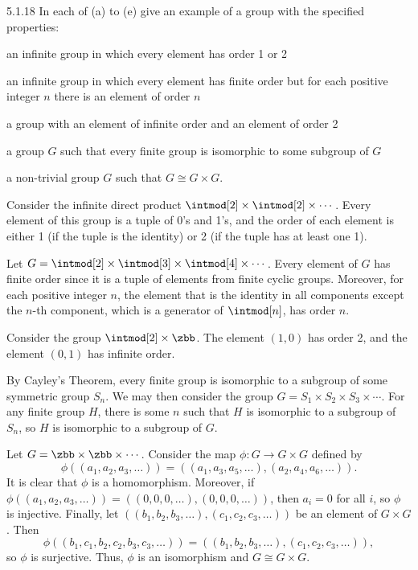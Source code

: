 \begin{exercise}{5.1.18}
    In each of (a) to (e) give an example of a group with the specified properties:
    \begin{subexercises}
        \item an infinite group in which every element has order 1 or 2
        \item an infinite group in which every element has finite order but for each positive integer $n$ there is an element of order $n$
        \item a group with an element of infinite order and an element of order 2
        \item a group $G$ such that every finite group is isomorphic to some subgroup of $G$
        \item a non-trivial group $G$ such that $G \cong G \times G$.
    \end{subexercises}
\end{exercise}

\begin{solenum}
    \item Consider the infinite direct product $\intmod[2] \times \intmod[2] \times \cdots$.
	Every element of this group is a tuple of 0's and 1's, and the order of each element is either 1 (if the tuple is the identity) or 2 (if the tuple has at least one 1).
    \item Let $G = \intmod[2] \times \intmod[3] \times \intmod[4] \times \cdots$.
	Every element of $G$ has finite order since it is a tuple of elements from finite cyclic groups.
	Moreover, for each positive integer $n$, the element that is the identity in all components except the $n$-th component, which is a generator of $\intmod[n]$, has order $n$.
    \item Consider the group $\intmod[2] \times \zbb$.
	The element $(1, 0)$ has order 2, and the element $(0, 1)$ has infinite order.
    \item By Cayley's Theorem, every finite group is isomorphic to a subgroup of some symmetric group $S_n$.
	We may then consider the group $G = S_1 \times S_2 \times S_3 \times \cdots$.
	For any finite group $H$, there is some $n$ such that $H$ is isomorphic to a subgroup of $S_n$, so $H$ is isomorphic to a subgroup of $G$.
    \item Let $G = \zbb \times \zbb \times \cdots$.
	Consider the map $\phi : G \to G \times G$ defined by
    \[
    	\phi((a_1, a_2, a_3, \ldots)) = ((a_1, a_3, a_5, \ldots), (a_2, a_4, a_6, \ldots)).
    \]
    It is clear that $\phi$ is a homomorphism.
	Moreover, if $\phi((a_1, a_2, a_3, \ldots)) = ((0, 0, 0, \ldots), (0, 0, 0, \ldots))$, then $a_i = 0$ for all $i$, so $\phi$ is injective.
	Finally, let $((b_1, b_2, b_3, \ldots), (c_1, c_2, c_3, \ldots))$ be an element of $G \times G$.
	Then 
    \[
    	\phi((b_1, c_1, b_2, c_2, b_3, c_3, \ldots)) = ((b_1, b_2, b_3, \ldots), (c_1, c_2, c_3, \ldots)),
    \]
    so $\phi$ is surjective.
	Thus, $\phi$ is an isomorphism and $G \cong G \times G$.
\end{solenum}